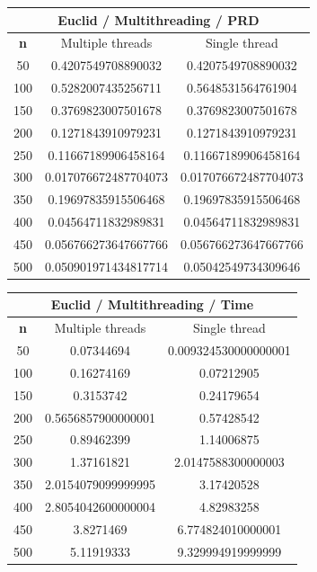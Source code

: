 \documentclass{article}
\begin{document}
\begin{center}
\begin{tabular}{|c|c|c|}
\hline
\multicolumn{3}{|c|}{\textbf{Euclid / Multithreading / PRD}}\\
\hline
\textbf{n} & Multiple threads & Single thread\\
\hline
50 & 0.4207549708890032 & 0.4207549708890032\\
\hline
100 & 0.5282007435256711 & 0.5648531564761904\\
\hline
150 & 0.3769823007501678 & 0.3769823007501678\\
\hline
200 & 0.1271843910979231 & 0.1271843910979231\\
\hline
250 & 0.11667189906458164 & 0.11667189906458164\\
\hline
300 & 0.017076672487704073 & 0.017076672487704073\\
\hline
350 & 0.19697835915506468 & 0.19697835915506468\\
\hline
400 & 0.04564711832989831 & 0.04564711832989831\\
\hline
450 & 0.056766273647667766 & 0.056766273647667766\\
\hline
500 & 0.050901971434817714 & 0.05042549734309646\\
\hline
\end{tabular}
\end{center}


\begin{center}
\begin{tabular}{|c|c|c|}
\hline
\multicolumn{3}{|c|}{\textbf{Euclid / Multithreading / Time}}\\
\hline
\textbf{n} & Multiple threads & Single thread\\
\hline
50 & 0.07344694 & 0.009324530000000001\\
\hline
100 & 0.16274169 & 0.07212905\\
\hline
150 & 0.3153742 & 0.24179654\\
\hline
200 & 0.5656857900000001 & 0.57428542\\
\hline
250 & 0.89462399 & 1.14006875\\
\hline
300 & 1.37161821 & 2.0147588300000003\\
\hline
350 & 2.0154079099999995 & 3.17420528\\
\hline
400 & 2.8054042600000004 & 4.82983258\\
\hline
450 & 3.8271469 & 6.774824010000001\\
\hline
500 & 5.11919333 & 9.329994919999999\\
\hline
\end{tabular}
\end{center}
\end{document}
